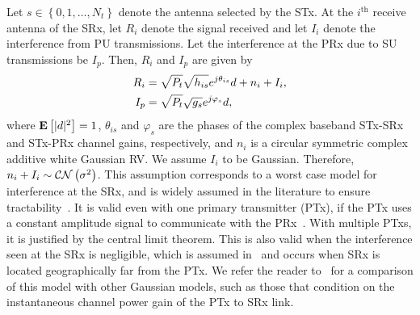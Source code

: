 \documentclass[12pt,draftcls,peerreview,onecolumn]{IEEEtran}
\newcommand{\CN}{{\cal CN}}
\newcommand{\expect}[1]{{\bf{E}}\left[{#1}\right]}
\newcommand{\nx}{{0}}
\newcommand{\Nt}{{N_t}}
\newcommand{\Pt}{{P_t}}
\newcommand{\such}{h}
\newcommand{\puch}{g}
\newcommand{\hk}[1]{{\such_{#1}}}
\newcommand{\gk}[1]{{\puch_{#1}}}
\newcommand{\Rsrx}{R_{i}}
\newcommand{\Iprx}{I_{p}}
\newcommand{\Isrx}{I_{i}}
\newcommand{\noise}{n_i}
\newcommand{\noisevar}{\sigma^2}
\newcommand{\allopts}{\left\{\nx,1,\ldots,\Nt\right\}}
\newcommand{\suchph}{\theta}
\newcommand{\puchph}{\varphi}
\newcommand{\thetahk}{\suchph_{is}}
\newcommand{\thetagk}{\puchph_{s}}
\newcommand{\ith}{i^{\text{th}}}
\begin{document}
Let $s\in\allopts$ denote the antenna selected by the STx. %
 At the $\ith$ receive antenna of the SRx, let $\Rsrx$ denote the signal received and let $\Isrx$ denote the interference from PU transmissions. Let the interference at the PRx due to SU transmissions be $\Iprx$. Then, $\Rsrx$ and $\Iprx$ are given by
%
\begin{align}
\label{eq:r_su}
 \Rsrx &= \sqrt{\Pt}\sqrt{\hk{is}} e^{j\thetahk} \datasymbol + \noise + \Isrx, \\
 \label{eq:i}
 \Iprx &= \sqrt{\Pt}\sqrt{\gk{s}} e^{j\thetagk} \datasymbol ,
\end{align}
%
where $\expect{|\datasymbol|^2}=1$, $\thetahk$ and $\thetagk$ are the phases of the complex baseband STx-SRx and STx-PRx channel gains, respectively, and $\noise$ is a circular symmetric complex additive white Gaussian RV. We assume $\Isrx$ to be Gaussian. Therefore, $\noise + \Isrx\sim \CN\left(\noisevar\right)$. This assumption corresponds to a worst case model for interference at the SRx, and is widely assumed in the literature to ensure tractability~\cite{Sarvendranath_2013_TCOM,Wang_2011_TCom, Kashyap_2014_TCOM,Sarvendranath_2014_TCOM}. It is valid even with one primary transmitter (PTx), if the PTx uses a constant amplitude signal to communicate with the PRx~\cite{Kashyap_2014_TCOM}. With multiple PTxs, it is justified by the central limit theorem. This is also valid when the interference seen at the SRx is negligible, which is assumed in~\cite{musavian_2009_tcom,RZhang_2009_TWC,li_2011_pimrc} and occurs when SRx is located geographically far from the PTx. We refer the reader to~\cite{das_2015_twc} for a comparison of this model with other Gaussian models, such as those that condition on the instantaneous channel power gain of the PTx to SRx link. 
\end{document}
